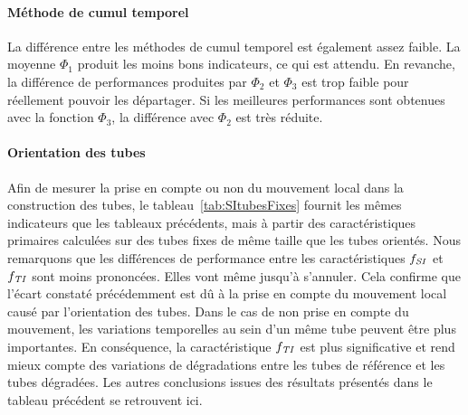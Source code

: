 \paragraph{Méthode de cumul temporel}
La différence entre les méthodes de cumul temporel est également assez faible. La moyenne $\Phi_1$ produit les moins bons indicateurs, ce qui est attendu. En revanche, la différence de performances produites par $\Phi_2$ et $\Phi_3$ est trop faible pour réellement pouvoir les départager. Si les meilleures performances sont obtenues avec la fonction $\Phi_3$, la différence avec $\Phi_2$ est très réduite.


\paragraph{Orientation des tubes}
Afin de mesurer la prise en compte ou non du mouvement local dans la construction des tubes, le tableau~\ref{tab:SItubesFixes} fournit les mêmes indicateurs que les tableaux précédents, mais à partir des caractéristiques primaires calculées sur des tubes fixes de même taille que les tubes orientés. Nous remarquons que les différences de performance entre les caractéristiques $f_{\mathit{SI}}$ et $f_{\mathit{TI}}$ sont moins prononcées. Elles vont même jusqu'à s'annuler. Cela confirme que l'écart constaté précédemment est dû à la prise en compte du mouvement local causé par l'orientation des tubes. Dans le cas de non prise en compte du mouvement, les variations temporelles au sein d'un même tube peuvent être plus importantes. En conséquence, la caractéristique $f_{\mathit{TI}}$ est plus significative et rend mieux compte des variations de dégradations entre les tubes de référence et les tubes dégradées. Les autres conclusions issues des résultats présentés dans le tableau précédent se retrouvent ici.


